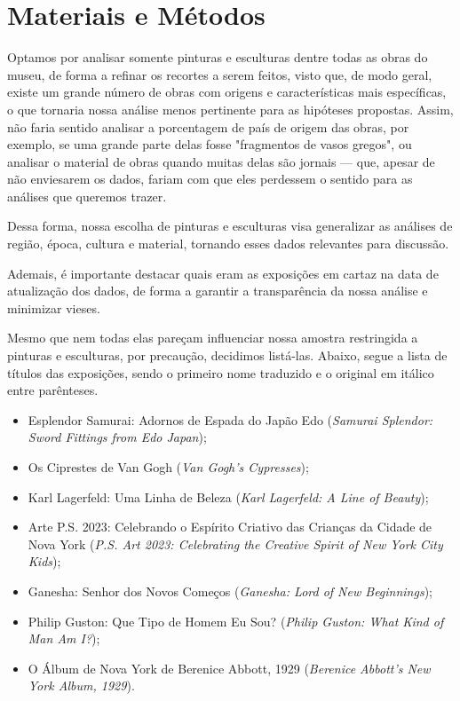 \documentclass[11pt,a4paper]{article}
\begin{document}
\section{Materiais e Métodos}
Optamos por analisar somente pinturas e esculturas dentre todas as obras do museu, de forma a refinar os recortes a serem feitos, visto que, de modo geral, existe um grande número de obras com origens e características mais específicas, o que tornaria nossa análise menos pertinente para as hipóteses propostas. Assim, não faria sentido analisar a porcentagem de país de origem das obras, por exemplo, se uma grande parte delas fosse "fragmentos de vasos gregos", ou analisar o material de obras quando muitas delas são jornais --- que, apesar de não enviesarem os dados, fariam com que eles perdessem o sentido para as análises que queremos trazer.

Dessa forma, nossa escolha de pinturas e esculturas visa generalizar as análises de região, época, cultura e material, tornando esses dados relevantes para discussão.

Ademais, é importante destacar quais eram as exposições em cartaz na data de atualização dos dados, de forma a garantir a transparência da nossa análise e minimizar vieses.

Mesmo que nem todas elas pareçam influenciar nossa amostra restringida a pinturas e esculturas, por precaução, decidimos listá-las. Abaixo, segue a lista de títulos das exposições, sendo o primeiro nome traduzido e o original em itálico entre parênteses.

\begin{itemize}
    \item Esplendor Samurai: Adornos de Espada do Japão Edo (\textit{Samurai Splendor: Sword Fittings from Edo Japan});
    \item Os Ciprestes de Van Gogh (\textit{Van Gogh's Cypresses});
    \item Karl Lagerfeld: Uma Linha de Beleza (\textit{Karl Lagerfeld: A Line of Beauty});
    \item Arte P.S. 2023: Celebrando o Espírito Criativo das Crianças da Cidade de Nova York (\textit{P.S. Art 2023: Celebrating the Creative Spirit of New York City Kids});
    \item Ganesha: Senhor dos Novos Começos (\textit{Ganesha: Lord of New Beginnings});
    \item Philip Guston: Que Tipo de Homem Eu Sou? (\textit{Philip Guston: What Kind of Man Am I?});
    \item O Álbum de Nova York de Berenice Abbott, 1929 (\textit{Berenice Abbott's New York Album, 1929}).
\end{itemize}
\end{document}
